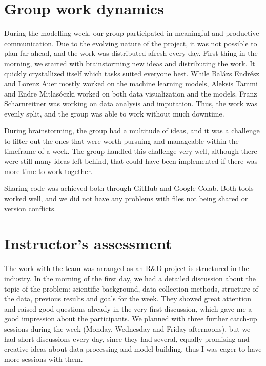 \documentclass{article}
\begin{document}
\section{Group work dynamics}

During the modelling week, our group participated in meaningful and productive
communication. Due to the evolving nature of the project, it was not possible
to plan far ahead, and the work was distributed afresh every day. First thing
in the morning, we started with brainstorming new ideas and distributing the
work. It quickly crystallized itself which tasks suited everyone best. While
Bal{\'a}zs Endr{\'e}sz and Lorenz Auer mostly worked on the machine learning
models, Aleksis Tammi and Endre Mitlas{\'o}czki worked on both data
visualization and the models. Franz Scharnreitner was working on data analysis
and imputation. Thus, the work was evenly split, and the group was able to
work without much downtime.

During brainstorming, the group had a multitude of ideas, and it was a
challenge to filter out the ones that were worth pursuing and manageable
within the timeframe of a week. The group handled this challenge very well,
although there were still many ideas left behind, that could have been
implemented if there was more time to work together.

Sharing code was achieved both through GitHub and Google Colab. Both tools
worked well, and we did not have any problems with files not being shared or
version conflicts.

\section{Instructor's assessment}

The work with the team was arranged as an R$\&$D project is structured in the industry. In the morning of the first day, we had a detailed discussion about the topic of the problem: scientific background, data collection methods, structure of the data, previous results and goals for the week. They showed great attention and raised good questions already in the very first discussion, which gave me a good impression about the participants. We planned with three further catch-up sessions during the week (Monday, Wednesday and Friday afternoons), but we had short discussions every day, since they had several, equally promising and creative ideas about data processing and model building, thus I was eager to have more sessions with them.
\end{document}
